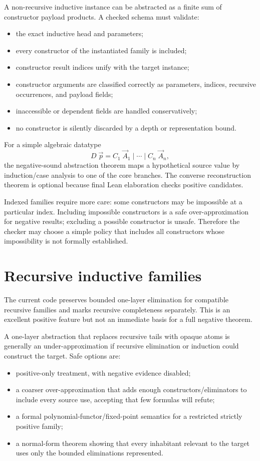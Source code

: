 \documentclass[11pt,letterpaper,openany]{report}
\theoremstyle{definition}
\theoremstyle{remark}
\begin{document}
A non-recursive inductive instance can be abstracted as a finite sum of constructor payload products. A checked schema must validate:

\begin{itemize}
\item the exact inductive head and parameters;
\item every constructor of the instantiated family is included;
\item constructor result indices unify with the target instance;
\item constructor arguments are classified correctly as parameters, indices, recursive occurrences, and payload fields;
\item inaccessible or dependent fields are handled conservatively;
\item no constructor is silently discarded by a depth or representation bound.
\end{itemize}

For a simple algebraic datatype
\[
  D\;\vec p = C_1\;\vec A_1 \mid \cdots \mid C_n\;\vec A_n,
\]
the negative-sound abstraction theorem maps a hypothetical source value by induction/case analysis to one of the core branches. The converse reconstruction theorem is optional because final Lean elaboration checks positive candidates.

Indexed families require more care: some constructors may be impossible at a particular index. Including impossible constructors is a safe over-approximation for negative results; excluding a possible constructor is unsafe. Therefore the checker may choose a simple policy that includes all constructors whose impossibility is not formally established.

\section{Recursive inductive families}

The current code preserves bounded one-layer elimination for compatible recursive families and marks recursive completeness separately. This is an excellent positive feature but not an immediate basis for a full negative theorem.

A one-layer abstraction that replaces recursive tails with opaque atoms is generally an under-approximation if recursive elimination or induction could construct the target. Safe options are:

\begin{itemize}
\item positive-only treatment, with negative evidence disabled;
\item a coarser over-approximation that adds enough constructors/eliminators to include every source use, accepting that few formulas will refute;
\item a formal polynomial-functor/fixed-point semantics for a restricted strictly positive family;
\item a normal-form theorem showing that every inhabitant relevant to the target uses only the bounded eliminations represented.
\end{itemize}
\end{document}
